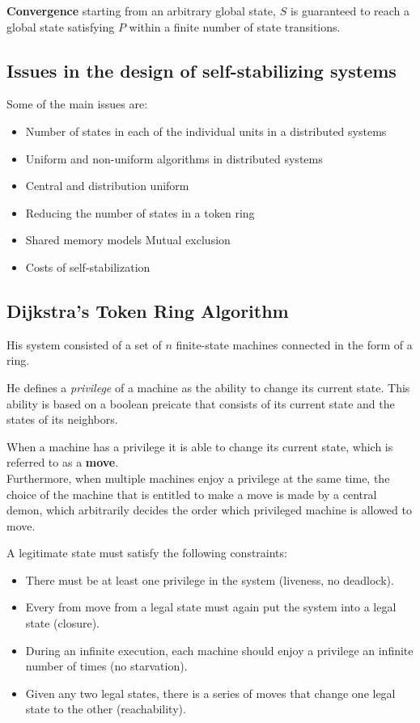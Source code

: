 \textbf{Convergence} starting from an arbitrary global state, $S$ is guaranteed to reach a global state satisfying $P$ within a finite number of state transitions.


\subsection{Issues in the design of self-stabilizing systems}
Some of the main issues are:
\begin{itemize}
   \item Number of states in each of the individual units in a distributed systems
   \item Uniform and non-uniform algorithms in distributed systems
   \item Central and distribution uniform
   \item Reducing the number of states in a token ring
   \item Shared memory models Mutual exclusion 
   \item Costs of self-stabilization
\end{itemize}

\subsection{Dijkstra's Token Ring Algorithm}
His system consisted of a set of $n$ finite-state machines connected in the form of a ring.

He defines a \textit{privilege} of a machine as the ability to change its current state.
This ability is based on a boolean preicate that consists of its current state and the states of its neighbors.

When a machine has a privilege it is able to change its current state, which is referred to as a \textbf{move}.\\
Furthermore, when multiple machines enjoy a privilege at the same time, the choice of the machine that is entitled to make a move is made by a central demon, which arbitrarily decides the order which privileged machine is allowed to move.

A legitimate state must satisfy the following constraints:
\begin{itemize}
   \item There must be at least one privilege in the system (liveness, no deadlock).
   \item Every from move from a legal state must again put the system into a legal state (closure).
   \item During an infinite execution, each machine should enjoy a privilege an infinite number of times (no starvation).
   \item Given any two legal states, there is a series of moves that change one legal state to the other (reachability).
\end{itemize}

